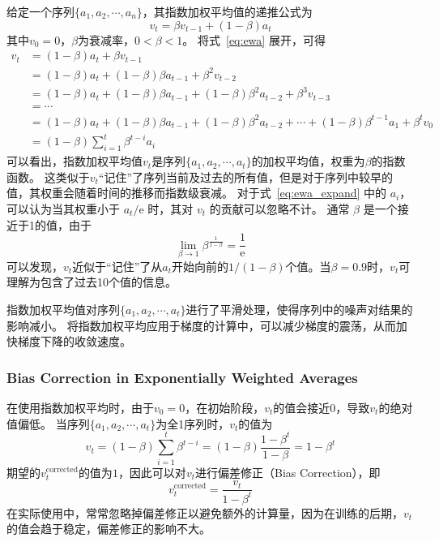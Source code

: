 给定一个序列$\{a_1, a_2, \cdots, a_n\}$，其指数加权平均值的递推公式为
\begin{equation}
    v_t = \beta v_{t-1} + (1 - \beta)a_t
    \label{eq:ewa}
\end{equation}
其中$v_0 = 0$，$\beta$为衰减率，$0 < \beta < 1$。
将式~\eqref{eq:ewa} 展开，可得
\begin{equation}
    \begin{aligned}
        v_t &= (1 - \beta)a_t + \beta v_{t-1} \\
            &= (1 - \beta)a_t + (1 - \beta)\beta a_{t-1} + \beta^2 v_{t-2} \\
            &= (1 - \beta)a_t + (1 - \beta)\beta a_{t-1} + (1 - \beta)\beta^2 a_{t-2} + \beta^3 v_{t-3} \\
            &= \cdots \\
            &= (1 - \beta)a_t + (1 - \beta)\beta a_{t-1} + (1 - \beta)\beta^2 a_{t-2} + \cdots + (1 - \beta)\beta^{t-1}a_1 + \beta^t v_0 \\
            &= (1 - \beta)\sum_{i=1}^t\beta^{t-i}a_i
    \end{aligned}
    \label{eq:ewa_expand}
\end{equation}
可以看出，指数加权平均值$v_t$是序列$\{a_1, a_2, \cdots, a_t\}$的加权平均值，权重为$\beta$的指数函数。
这类似于$v_t$“记住”了序列当前及过去的所有值，但是对于序列中较早的值，其权重会随着时间的推移而指数级衰减。
对于式~\eqref{eq:ewa_expand} 中的 $a_i$，可以认为当其权重小于 $a_t/\mathrm{e}$ 时，其对 $v_t$ 的贡献可以忽略不计。
通常 $\beta$ 是一个接近于1的值，由于
\begin{equation}
    \lim_{\beta \to 1}  \beta^{\frac{\scriptstyle 1}{\scriptstyle 1-\beta}} = \frac{1}{\mathrm{e}}
\end{equation}
可以发现，$v_t$近似于“记住”了从$a_t$开始向前的$1/(1-\beta)$个值。当$\beta=0.9$时，$v_t$可理解为包含了过去10个值的信息。

指数加权平均值对序列$\{a_1, a_2, \cdots, a_t\}$进行了平滑处理，使得序列中的噪声对结果的影响减小。
将指数加权平均应用于梯度的计算中，可以减少梯度的震荡，从而加快梯度下降的收敛速度。

\subsubsection{Bias Correction in Exponentially Weighted Averages}

在使用指数加权平均时，由于$v_0 = 0$，在初始阶段，$v_t$的值会接近0，导致$v_t$的绝对值偏低。
当序列$\{a_1, a_2, \cdots, a_t\}$为全1序列时，$v_t$的值为
\begin{equation}
    v_t = (1 - \beta)\sum_{i=1}^t\beta^{t-i} = (1 - \beta)\frac{1 - \beta^t}{1 - \beta} = 1 - \beta^t
\end{equation}
期望的$v_t^{\mathrm{corrected}}$的值为$1$，因此可以对$v_t$进行偏差修正（Bias Correction），即
\begin{equation}
    v_t^{\mathrm{corrected}} = \frac{v_t}{1 - \beta^t}
\end{equation}
在实际使用中，常常忽略掉偏差修正以避免额外的计算量，因为在训练的后期，$v_t$的值会趋于稳定，偏差修正的影响不大。

